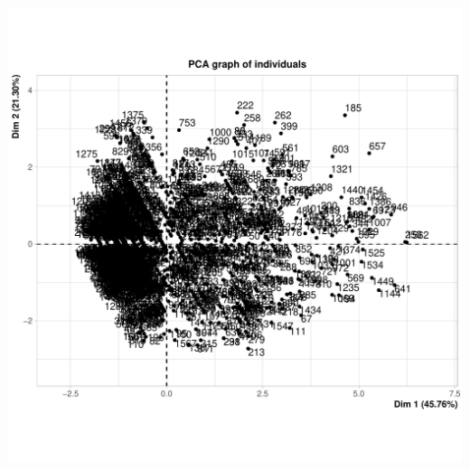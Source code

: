 \documentclass[11pt,a4paper, x11names]{article}\usepackage[]{graphicx}\usepackage[]{color}
\makeatletter
\def\maxwidth{ %
  \ifdim\Gin@nat@width>\linewidth
    \linewidth
  \else
    \Gin@nat@width
  \fi
}
\newenvironment{knitrout}{}{} %
\makeatother
\begin{document}
\begin{knitrout}
\color{fgcolor}
\includegraphics[width=\maxwidth]{figure/Analyse_factorielle-1} 


\end{knitrout}
\end{document}
